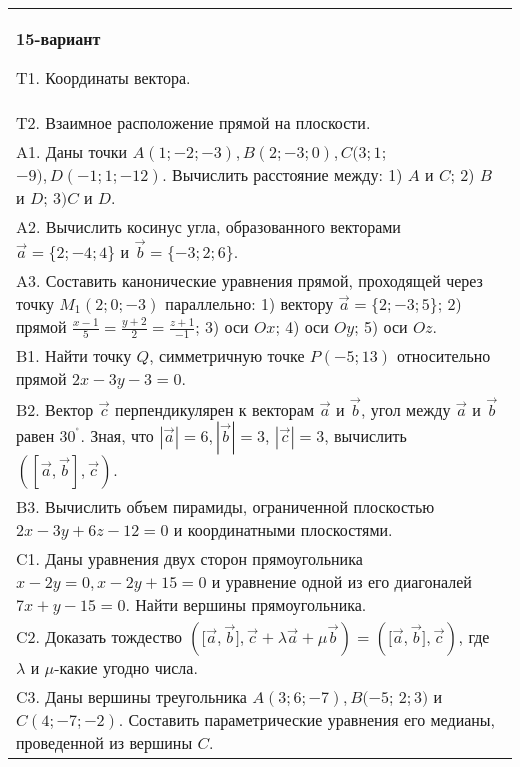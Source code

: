 \documentclass{article}
\begin{document}
\begin{tabular}{m{17cm}}
\textbf{15-вариант}
\newline

T1. 
Координаты вектора.
 \\
T2. 
Взаимное расположение прямой на плоскости.
 \\
A1. 
Даны точки \(A(1; - 2; - 3),B(2; - 3;0),C(3;1\); \(- 9),D( - 1;1; - 12)\). Вычислить расстояние между: 1) \(A\) и \(C\); 2) \(B\) и \(D\); 3\()C\) и \(D\).
 \\
A2. 
Вычислить косинус угла, образованного векторами \(\overrightarrow{a} = \{ 2; - 4;4\}\) и \(\overrightarrow{b} = \{ - 3;2;6\}\).
 \\
A3. 
Составить канонические уравнения прямой, проходящей через точку \(M_{1}(2;0; - 3)\) параллельно: 1) вектору \(\overrightarrow{a} = \{ 2; - 3;5\}\); 2) прямой \(\frac{x - 1}{5} = \frac{y + 2}{2} = \frac{z + 1}{- 1}\); 3) оси \(Ox\); 4) оси \(Oy\); 5) оси \(Oz\).
 \\
B1. 
Найти точку \(Q\), симметричную точке \(P( - 5;13)\) относительно прямой \(2x - 3y - 3 = 0.\)
 \\
B2. 
Вектор \(\overrightarrow{c}\) перпендикулярен к векторам \(\overrightarrow{a}\) и \(\overrightarrow{b}\), угол между \(\overrightarrow{a}\) и \(\overrightarrow{b}\) равен \(30^{{^\circ}}\). Зная, что \(|\overrightarrow{a}| = 6,|\overrightarrow{b}| = 3\), \(|\overrightarrow{c}| = 3\), вычислить \(\left( \left\lbrack \overrightarrow{a},\overrightarrow{b} \right\rbrack,\overrightarrow{c} \right)\).
 \\
B3. 
Вычислить объем пирамиды, ограниченной плоскостью \(2x - 3y + 6z - 12 = 0\) и координатными плоскостями.
 \\
C1. 
Даны уравнения двух сторон прямоугольника \(x - 2y = 0,x - 2y + 15 = 0\) и уравнение одной из его диагоналей \(7x + y - 15 = 0\). Найти вершины прямоугольника.
 \\
C2. 
Доказать тождество \((\lbrack\overrightarrow{a},\overrightarrow{b}\rbrack,\overrightarrow{c} + \lambda\overrightarrow{a} + \mu\overrightarrow{b}) = (\lbrack\overrightarrow{a},\overrightarrow{b}\rbrack,\overrightarrow{c})\), где \(\lambda\) и \(\mu\)-какие угодно числа.
 \\
C3. 
Даны вершины треугольника \(A(3;6; - 7),B( - 5\); \(2;3)\) и \(C(4; - 7; - 2)\). Составить параметрические уравнения его медианы, проведенной из вершины \(C\).
 \\

\end{tabular}
\vspace{1cm}
\end{document}
